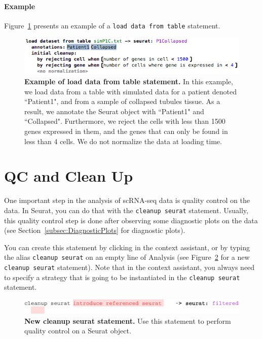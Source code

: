 \paragraph{Example} Figure~\ref{fig:ExampleLoadTable} presents an example of a
\texttt{load data from table} statement.

\begin{figure}[h!tbp]
  \centering
  \includegraphics[width=\figWidthWide]{figures/ExampleLoadTable.png}
    \caption[Example of load data from table statement.]{\textbf{Example of load data from table statement.}
    In this example, we load data from a table with simulated data for a patient
    denoted ``Patient1", and from a sample of collapsed tubules tissue.
    As a result, we annotate the Seurat object with ``Patient1" and
    ``Collapsed". Furthermore, we reject the cells with less than 1500 genes expressed in
    them, and the genes that can only be found in less than 4 cells. We do not normalize
    the data at loading time.} 
\label{fig:ExampleLoadTable}
\end{figure}

\section{QC and Clean Up}\label{sec:CleanupSeurat}
One important step in the analysis of scRNA-seq data is quality control on the data. In
Seurat, you can do that with the \texttt{cleanup seurat} statement. Usually, this
quality control step is done after observing some diagnostic plots on the data 
(see Section~\ref{subsec:DiagnosticPlots} for diagnostic plots).

You can create this statement by clicking  in the context assistant,
or by typing the alias \texttt{cleanup seurat} on an empty line of Analysis (see
Figure~\ref{fig:CleanupSeurat} for a new \texttt{cleanup seurat} statement). Note that in
the context assistant, you always need to specify a strategy that is going to be instantiated
in the \texttt{cleanup seurat} statement.

\begin{figure}[h!tbp]
  \centering
  \includegraphics[width=\figWidthWide]{figures/CleanupSeurat.pdf}
    \caption[New cleanup seurat statement.]{\textbf{New cleanup seurat statement.}
    Use this statement to perform quality control on a Seurat object.}
\label{fig:CleanupSeurat}
\end{figure}

